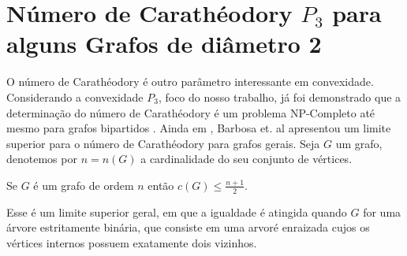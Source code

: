 \chapter{Número de Carathéodory $P_3$ para alguns Grafos de diâmetro 2}
\label{cara}

O número de Carathéodory é outro parâmetro interessante em convexidade. Considerando a convexidade $P_3$, foco do nosso trabalho, já foi demonstrado que a determinação do número de Carathéodory é um problema NP-Completo até mesmo para grafos bipartidos \cite{Barbosa2012}. 
Ainda em \cite{Barbosa2012}, Barbosa et. al apresentou um limite superior para o número de Carathéodory para grafos gerais. Seja $G$ um grafo, denotemos por $n=n(G)$ a cardinalidade do seu conjunto de vértices.

\begin{theorem}\cite{Barbosa2012} 
\label{teo-barbosa2012}
Se $G$ é um grafo de ordem $n$ então $c(G) \leq \frac{n+1}{2}$. 
\end{theorem}

Esse é um limite superior geral, em que a igualdade é atingida quando $G$ for uma árvore estritamente binária, que consiste em uma arvoré enraizada cujos os vértices internos possuem exatamente dois vizinhos.





